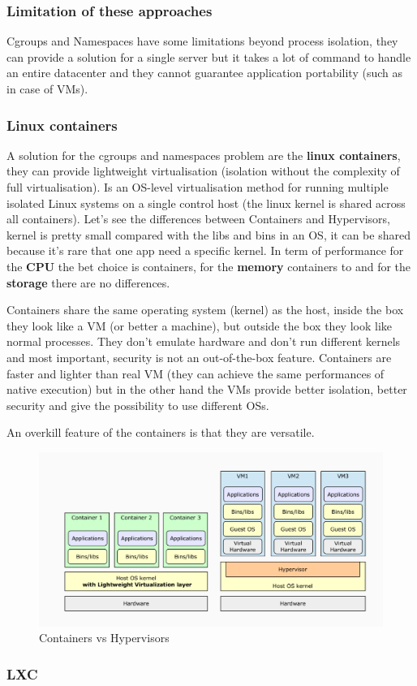 \subsubsection{Limitation of these approaches}
Cgroups and Namespaces have some limitations beyond process isolation, they can provide a solution for a single server but it takes a lot of command to handle an entire datacenter and they cannot guarantee application portability (such as in case of VMs).

\subsubsection{Linux containers}
A solution for the cgroups and namespaces problem are the \textbf{linux containers}, they can provide lightweight virtualisation (isolation without the complexity of full virtualisation). Is an OS-level virtualisation method for running multiple isolated Linux systems on a single control host (the linux kernel is shared across all containers). Let's see the differences between Containers and Hypervisors, kernel is pretty small compared with the libs and bins in an OS, it can be shared because it's rare that one app need a specific kernel. In term of performance for the \textbf{CPU} the bet choice is containers, for the \textbf{memory} containers to and for the \textbf{storage} there are no differences. 

Containers share the same operating system (kernel) as the host, inside the box they look like a VM (or better a machine), but outside the box they look like normal processes. They don't emulate hardware and don't run different kernels and most important, security is not an out-of-the-box feature. Containers are faster and lighter than real VM (they can achieve the same performances of native execution) but in the other hand the VMs provide better isolation, better security and give the possibility to use different OSs.

An overkill feature of the containers is that they are versatile.
\begin{figure}
    \centering
    \includegraphics[scale=0.30]{images/contvshyp.png}
    \caption{Containers vs Hypervisors}
    \label{fig:cvs}
\end{figure}
\subsubsection{LXC}